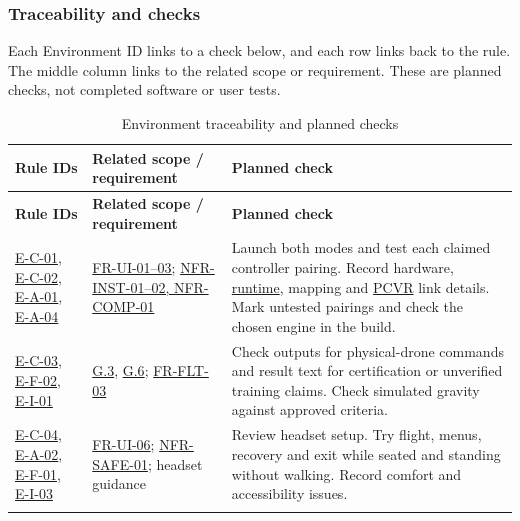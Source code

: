 \documentclass[12pt]{article}
\begin{document}
\subsubsection*{Traceability and checks}
Each Environment ID links to a check below, and each row links back to the rule.
The middle column links to the related scope or requirement. These are planned
checks, not completed software or user tests.

\begingroup\small\renewcommand{\arraystretch}{1.15}
\begin{longtable}{@{}>{\raggedright\arraybackslash}p{}
                         >{\raggedright\arraybackslash}p{}
                         >{\raggedright\arraybackslash}p{}@{}}
\caption{Environment traceability and planned checks}\label{tab:e-trace}\\
\toprule\textbf{Rule IDs} & \textbf{Related scope / requirement} &
\textbf{Planned check}\\\midrule\endfirsthead
\toprule\textbf{Rule IDs} & \textbf{Related scope / requirement} &
\textbf{Planned check}\\\midrule\endhead
\bottomrule\endfoot
{}\label{et-platform}
\hyperref[ec-platform]{E-C-01}, \hyperref[ec-hardware]{E-C-02},
\hyperref[ea-runtime]{E-A-01}, \hyperref[ea-evaluation]{E-A-04} &
\hyperref[sec:s2-interface]{FR-UI-01--03};
\hyperref[sec:s2-nfr]{NFR-INST-01--02, NFR-COMP-01} &
Launch both modes and test each claimed controller pairing. Record hardware,
\hyperlink{glos:Runtime}{runtime}, mapping and \hyperlink{glos:PCVR}{PCVR} link details. Mark untested pairings and check the
chosen engine in the build. \\
\label{et-scope}
\hyperref[ec-scope]{E-C-03}, \hyperref[ef-training]{E-F-02},
\hyperref[ei-boundary]{E-I-01} &
\hyperref[g3]{G.3}, \hyperref[g6]{G.6};
\hyperref[sec:s2-flight]{FR-FLT-03} &
Check outputs for physical-drone commands and result text for certification or
unverified training claims. Check simulated gravity against approved criteria. \\
\label{et-safety}
\hyperref[ec-safety]{E-C-04}, \hyperref[ea-space]{E-A-02},
\hyperref[ef-attention]{E-F-01}, \hyperref[ei-stationary]{E-I-03} &
\hyperref[sec:s2-interface]{FR-UI-06};
\hyperref[sec:s2-nfr]{NFR-SAFE-01}; headset guidance &
Review headset setup. Try flight, menus, recovery and exit while seated and
standing without walking. Record comfort and accessibility issues. \\
\label{et-release}

\end{longtable}
\end{document}
